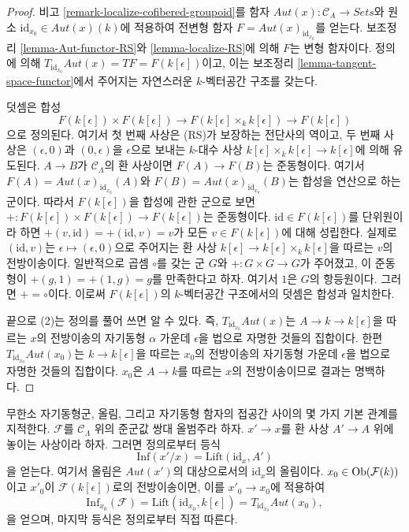 \begin{proof}
비고 \ref{remark-localize-cofibered-groupoid}를 함자
$\mathit{Aut}(x) : \mathcal{C}_A \to \textit{Sets}$와 원소
$\text{id}_{x_0} \in \mathit{Aut}(x)(k)$에 적용하여 전변형 함자
$F = \mathit{Aut}(x)_{\text{id}_{x_0}}$를 얻는다. 보조정리
\ref{lemma-Aut-functor-RS}와 \ref{lemma-localize-RS}에 의해
$F$는 변형 함자이다. 정의에 의해
$T_{\text{id}_{x_0}} \mathit{Aut}(x) = TF = F(k[\epsilon])$이고, 이는
보조정리 \ref{lemma-tangent-space-functor}에서 주어지는 자연스러운
$k$-벡터공간 구조를 갖는다.

\medskip\noindent
덧셈은 합성
$$
F(k[\epsilon]) \times F(k[\epsilon]) \longrightarrow
F(k[\epsilon] \times_k k[\epsilon]) \longrightarrow
F(k[\epsilon])
$$
으로 정의된다. 여기서 첫 번째 사상은 (RS)가 보장하는 전단사의 역이고,
두 번째 사상은 $(\epsilon, 0)$과 $(0, \epsilon)$을 $\epsilon$으로 보내는
$k$-대수 사상
$k[\epsilon] \times_k k[\epsilon] \to k[\epsilon]$에 의해 유도된다.
$A \to B$가 $\mathcal{C}_\Lambda$의 환 사상이면 $F(A) \to F(B)$는
준동형이다. 여기서 $F(A) = \mathit{Aut}(x)_{\text{id}_{x_0}}(A)$와
$F(B) = \mathit{Aut}(x)_{\text{id}_{x_0}}(B)$는 합성을 연산으로 하는
군이다. 따라서 $F(k[\epsilon])$을 합성에 관한 군으로 보면
$+ : F(k[\epsilon]) \times F(k[\epsilon])\to F(k[\epsilon])$는
준동형이다. $\text{id} \in F(k[\epsilon])$를 단위원이라 하면
$+(v, \text{id}) =
+(\text{id}, v) = v$가 모든 $v \in F(k[\epsilon])$에 대해 성립한다.
실제로 $(\text{id}, v)$는
$\epsilon \mapsto (\epsilon, 0)$으로 주어지는 환 사상
$k[\epsilon] \to k[\epsilon] \times_k k[\epsilon]$을 따르는
$v$의 전방이송이다.
일반적으로 곱셈 $\circ$를 갖는 군 $G$와
$+ : G \times G \to G$가 주어졌고, 이 준동형이
$+(g, 1) = +(1, g) = g$를 만족한다고 하자. 여기서 $1$은 $G$의
항등원이다. 그러면 $+ = \circ$이다. 이로써 $F(k[\epsilon])$의
$k$-벡터공간 구조에서의 덧셈은 합성과 일치한다.

\medskip\noindent
끝으로 (2)는 정의를 풀어 쓰면 알 수 있다. 즉,
$T_{\text{id}_{x_0}} \mathit{Aut}(x)$는
$A \to k \to k[\epsilon]$을 따르는 $x$의 전방이송의 자기동형
$\alpha$ 가운데 $\epsilon$을 법으로 자명한 것들의 집합이다.
한편 $T_{\text{id}_{x_0}} \mathit{Aut}(x_0)$는
$k \to k[\epsilon]$을 따르는 $x_0$의 전방이송의 자기동형 가운데
$\epsilon$을 법으로 자명한 것들의 집합이다. $x_0$은
$A \to k$를 따르는 $x$의 전방이송이므로 결과는 명백하다.
\end{proof}

\begin{remark}
\label{remark-infaut-lifting-equalities}
무한소 자기동형군, 올림, 그리고 자기동형 함자의 접공간 사이의 몇 가지
기본 관계를 지적한다. $\mathcal{F}$를 $\mathcal{C}_\Lambda$ 위의
준군값 쌍대 올범주라 하자. $x' \to x$를 환 사상
$A' \to A$ 위에 놓이는 사상이라 하자. 그러면 정의로부터 등식
$$
\text{Inf}(x'/x) = \text{Lift}(\text{id}_x, A')
$$
을 얻는다. 여기서 올림은 $\mathit{Aut}(x')$의 대상으로서의
$\text{id}_x$의 올림이다. $x_0 \in \mathop{\mathrm{Ob}}\nolimits(\mathcal{F}(k))$이고
$x'_0$이 $\mathcal{F}(k[\epsilon])$로의 전방이송이면, 이를
$x'_0 \to x_0$에 적용하여
$$
\text{Inf}_{x_0}(\mathcal{F}) =
\text{Lift}(\text{id}_{x_0}, k[\epsilon]) =
T_{\text{id}_{x_0}} \mathit{Aut}(x_0),
$$
을 얻으며, 마지막 등식은 정의로부터 직접 따른다.
\end{remark}

